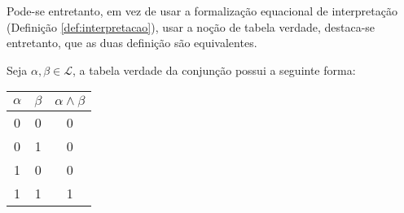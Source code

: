 Pode-se entretanto, em vez de usar a formalização equacional de interpretação (Definição \ref{def:interpretacao}), usar a noção de tabela verdade, destaca-se entretanto, que as duas definição são equivalentes.

\begin{definicao}\label{def:TabelaE}
  Seja $\alpha, \beta \in \mathcal{L}$, a tabela verdade da conjunção possui a seguinte forma:
  \begin{table}[H]
    \centering
    \begin{tabular}{|c|c|c|}
      \hline
      $\alpha$ & $\beta$ & $\alpha \land \beta$\\\hline
      0 & 0 & 0\\
      0 & 1 & 0\\
      1 & 0 & 0\\
      1 & 1 & 1\\
      \hline
    \end{tabular}
  \end{table} 
\end{definicao}





